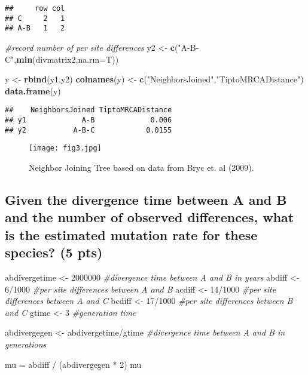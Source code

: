\documentclass[]{article}
\newenvironment{Shaded}{\begin{snugshade}}{\end{snugshade}}
\newcommand{\KeywordTok}[1]{\textcolor[rgb]{0.13,0.29,0.53}{\textbf{{#1}}}}
\newcommand{\DataTypeTok}[1]{\textcolor[rgb]{0.13,0.29,0.53}{{#1}}}
\newcommand{\DecValTok}[1]{\textcolor[rgb]{0.00,0.00,0.81}{{#1}}}
\newcommand{\StringTok}[1]{\textcolor[rgb]{0.31,0.60,0.02}{{#1}}}
\newcommand{\CommentTok}[1]{\textcolor[rgb]{0.56,0.35,0.01}{\textit{{#1}}}}
\newcommand{\NormalTok}[1]{{#1}}
\begin{document}
\begin{verbatim}
##     row col
## C     2   1
## A-B   1   2
\end{verbatim}

\begin{Shaded}
\begin{Highlighting}[]
\CommentTok{#record number of per site differences}
\NormalTok{y2 <-}\StringTok{ }\KeywordTok{c}\NormalTok{(}\StringTok{"A-B-C"}\NormalTok{,}\KeywordTok{min}\NormalTok{(divmatrix2,}\DataTypeTok{na.rm=}\NormalTok{T))}

\NormalTok{y <-}\StringTok{ }\KeywordTok{rbind}\NormalTok{(y1,y2)}
\KeywordTok{colnames}\NormalTok{(y) <-}\StringTok{ }\KeywordTok{c}\NormalTok{(}\StringTok{"NeighborsJoined"}\NormalTok{,}\StringTok{"TiptoMRCADistance"}\NormalTok{)}
\KeywordTok{data.frame}\NormalTok{(y)}
\end{Highlighting}
\end{Shaded}

\begin{verbatim}
##    NeighborsJoined TiptoMRCADistance
## y1             A-B             0.006
## y2           A-B-C            0.0155
\end{verbatim}

\begin{figure}[H]
\centering
\texttt{[image: fig3.jpg]}
\caption{\label{fig:njtree}Neighbor Joining Tree based on data from Bryc et. al (2009).}
\end{figure}

\subsection{Given the divergence time between A and B and the number of
observed differences, what is the estimated mutation rate for these
species? (5
pts)}\label{given-the-divergence-time-between-a-and-b-and-the-number-of-observed-differences-what-is-the-estimated-mutation-rate-for-these-species-5-pts}

\begin{Shaded}
\begin{Highlighting}[]
\NormalTok{abdivergetime <-}\StringTok{ }\DecValTok{2000000}     \CommentTok{#divergence time between A and B in years}
\NormalTok{abdiff <-}\StringTok{ }\DecValTok{6}\NormalTok{/}\DecValTok{1000}             \CommentTok{#per site differences between A and B}
\NormalTok{acdiff <-}\StringTok{ }\DecValTok{14}\NormalTok{/}\DecValTok{1000}            \CommentTok{#per site differences between A and C}
\NormalTok{bcdiff <-}\StringTok{ }\DecValTok{17}\NormalTok{/}\DecValTok{1000}            \CommentTok{#per site differences between B and C}
\NormalTok{gtime <-}\StringTok{ }\DecValTok{3}                   \CommentTok{#generation time}


\NormalTok{abdivergegen <-}\StringTok{ }\NormalTok{abdivergetime/gtime     }\CommentTok{#divergence time between A and B in generations}

\NormalTok{mu =}\StringTok{ }\NormalTok{abdiff /}\StringTok{ }\NormalTok{(abdivergegen *}\StringTok{ }\DecValTok{2}\NormalTok{)        }
\NormalTok{mu}
\end{Highlighting}
\end{Shaded}
\end{document}
